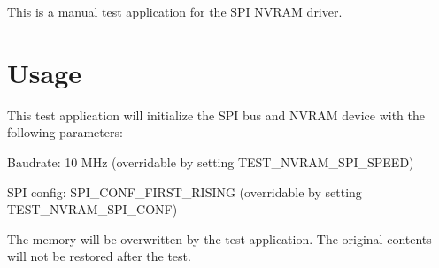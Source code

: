 This is a manual test application for the S\+PI N\+V\+R\+AM driver.

\section*{Usage}

This test application will initialize the S\+PI bus and N\+V\+R\+AM device with the following parameters\+:


\begin{DoxyItemize}
\item Baudrate\+: 10 M\+Hz (overridable by setting T\+E\+S\+T\+\_\+\+N\+V\+R\+A\+M\+\_\+\+S\+P\+I\+\_\+\+S\+P\+E\+ED)
\item S\+PI config\+: S\+P\+I\+\_\+\+C\+O\+N\+F\+\_\+\+F\+I\+R\+S\+T\+\_\+\+R\+I\+S\+I\+NG (overridable by setting T\+E\+S\+T\+\_\+\+N\+V\+R\+A\+M\+\_\+\+S\+P\+I\+\_\+\+C\+O\+NF)
\end{DoxyItemize}

The memory will be overwritten by the test application. The original contents will not be restored after the test. 